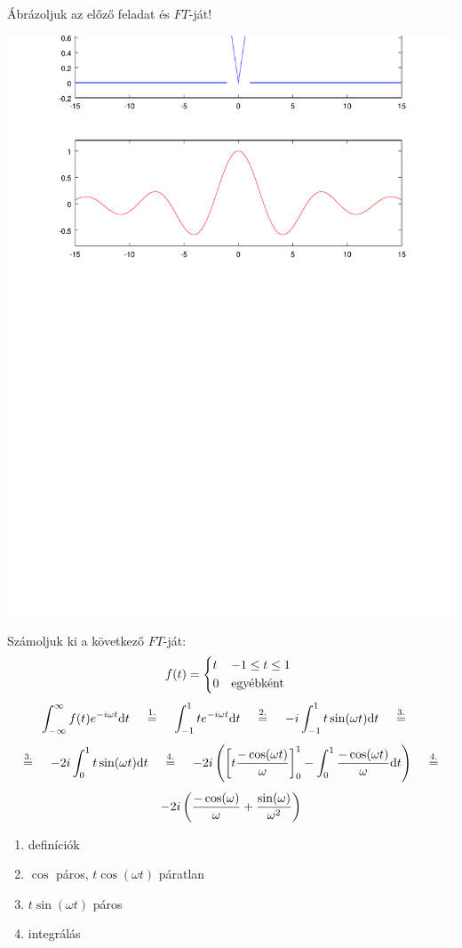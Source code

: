 \feladat Ábrázoljuk az előző feladat és $FT$-ját!
\begin{center}
\includegraphics[scale=0.9]{abszol}
\end{center}


\feladat Számoljuk ki a következő \fv{}$FT$-ját:
\begin{equation*}
f(t) =
   \begin{cases*}
      t & $-1 \le t \le 1$ \\
      0        & egyébként
   \end{cases*}
\end{equation*}
\begin{gather*}
\mhint{-\infty}{\infty}{f(t) e^{-i\omega t}}{t} \opover{1.}{=}
\mhint{-1}{1}{ t e^{-i\omega t}}{t} \opover{2.}{=}
-i\mhint{-1}{1}{t \sin(\omega t)}{t} \opover{3.}{=}\us
\opover{3.}{=}
-2i\mhint{0}{1}{t \sin(\omega t)}{t} \opover{4.}{=}
-2i\left( \mhpfv{0}{1}{t \frac{-\cos(\omega t)}{\omega}}-
\mhint{0}{1}{\frac{-\cos(\omega t)}{\omega}}{t} \right)
\opover{4.}{=}\us
-2i\left( \frac{-\cos(\omega)}{\omega}+\frac{\sin(\omega)}{\omega^2} \right)
\end{gather*}
\magy
\begin{enumerate}
\item definíciók
\item $\cos$ páros, $t\cos(\omega t)$ \kh páratlan
\item $t\sin(\omega t)$ páros
\item integrálás
\end{enumerate}


